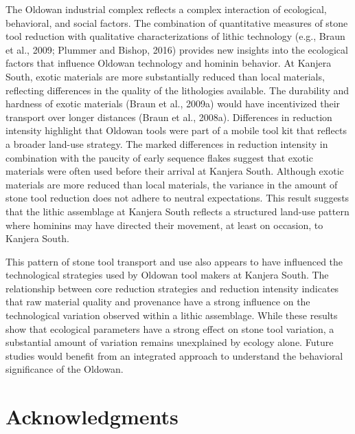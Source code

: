 \documentclass[]{elsarticle} %
\begin{document}
The Oldowan industrial complex reflects a complex interaction of
ecological, behavioral, and social factors. The combination of
quantitative measures of stone tool reduction with qualitative
characterizations of lithic technology (e.g., Braun et al., 2009;
\hspace{0pt}Plummer and Bishop, 2016\hspace{0pt}) provides new insights
into the ecological factors that influence Oldowan technology and
hominin behavior. At Kanjera South, exotic materials are more
substantially reduced than local materials, reflecting differences in
the quality of the lithologies available. The durability and hardness of
exotic materials (\hspace{0pt}Braun et al., 2009a\hspace{0pt}) would
have incentivized their transport over longer distances
(\hspace{0pt}Braun et al., 2008a\hspace{0pt}). Differences in reduction
intensity highlight that Oldowan tools were part of a mobile tool kit
that reflects a broader land-use strategy. The marked differences in
reduction intensity in combination with the paucity of early sequence
flakes suggest that exotic materials were often used before their
arrival at Kanjera South. Although exotic materials are more reduced
than local materials, the variance in the amount of stone tool reduction
does not adhere to neutral expectations. This result suggests that the
lithic assemblage at Kanjera South reflects a structured land-use
pattern where hominins may have directed their movement, at least on
occasion, to Kanjera South.

This pattern of stone tool transport and use also appears to have
influenced the technological strategies used by Oldowan tool makers at
Kanjera South. The relationship between core reduction strategies and
reduction intensity indicates that raw material quality and provenance
have a strong influence on the technological variation observed within a
lithic assemblage. While these results show that ecological parameters
have a strong effect on stone tool variation, a substantial amount of
variation remains unexplained by ecology alone. Future studies would
benefit from an integrated approach to understand the behavioral
significance of the Oldowan.

\hypertarget{acknowledgments}{%
\section{Acknowledgments}\label{acknowledgments}}
\end{document}

